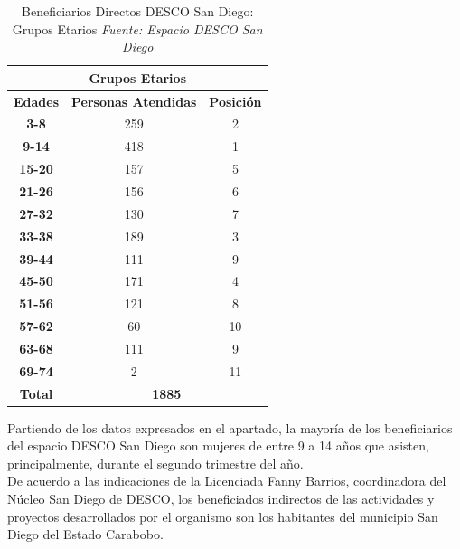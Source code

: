 \documentclass[11pt, a4paper, twosides]{report}
\begin{document}
\begin{table}[h]
	\centering
	\begin{tabular}{|c|c|c|}
		\hline
		\multicolumn{3}{|c|}{\cellcolor{gray75} \textbf{Grupos Etarios}}                     \\ \hline
		\textbf{Edades} & \textbf{Personas Atendidas} & \textbf{Posición} \\ \hline
		\textbf{3-8}    & 259                         & 2                 \\ \hline
		\textbf{9-14}   & 418                         & 1                 \\ \hline
		\textbf{15-20}  & 157                         & 5                 \\ \hline
		\textbf{21-26}  & 156                         & 6                 \\ \hline
		\textbf{27-32}  & 130                         & 7                 \\ \hline
		\textbf{33-38}  & 189                         & 3                 \\ \hline
		\textbf{39-44}  & 111                         & 9                 \\ \hline
		\textbf{45-50}  & 171                         & 4                 \\ \hline
		\textbf{51-56}  & 121                         & 8                 \\ \hline
		\textbf{57-62}  & 60                          & 10                \\ \hline
		\textbf{63-68}  & 111                         & 9                 \\ \hline
		\textbf{69-74}  & 2                           & 11                \\ \hline
		\textbf{Total}  & \multicolumn{2}{c|}{\textbf{1885}}              \\ \hline
	\end{tabular}
	\caption{Beneficiarios Directos DESCO San Diego: Grupos Etarios \textit{Fuente: Espacio DESCO San Diego}}
	\label{tabla3}
\end{table}
Partiendo de los datos expresados en el apartado, la mayoría de los beneficiarios del espacio DESCO San Diego son mujeres de entre 9 a 14 años que asisten, principalmente, durante el segundo trimestre del año.\\
De acuerdo a las indicaciones de la Licenciada Fanny Barrios, coordinadora del Núcleo San Diego de DESCO, los beneficiados indirectos de las actividades y proyectos desarrollados por el organismo son los habitantes del municipio San Diego del Estado Carabobo.
\end{document}
